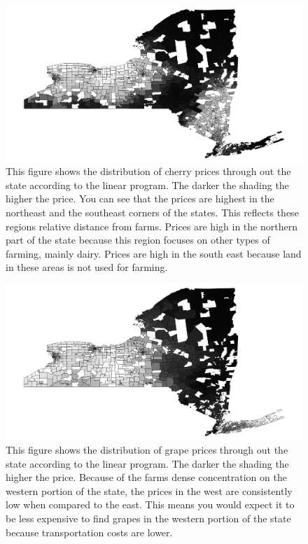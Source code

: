 \documentclass{report}
\begin{document}
\begin{figure}
\centering
\begin{framed}
\includegraphics[scale=.50]{prices_66}
\caption{This figure shows the distribution of cherry prices through out the state according to the linear program. The darker the shading the higher the price. You can see that the prices are highest in the northeast and the southeast corners of the states. This reflects these regions relative distance from farms. Prices are high in the northern part of the state because this region focuses on other types of farming, mainly dairy. Prices are high in the south east because land in these areas is not used for farming. }
\label{fig:prices_66}
\end{framed}
\end{figure}


\begin{figure}
\centering
\begin{framed}
\includegraphics[scale=.50]{prices_69}
\caption{This figure shows the distribution of grape prices through out the state according to the linear program. The darker the shading the higher the price. Because of the farms dense concentration on the western portion of the state, the prices in the west are consistently low when compared to the east. This means you would expect it to be less expensive to find grapes in the western portion of the state because transportation costs are lower.}
\label{fig:prices_69}
\end{framed}
\end{figure}
\end{document}
